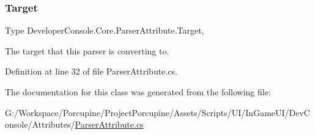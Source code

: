 \subsubsection{\texorpdfstring{Target}{Target}}
{\footnotesize\ttfamily Type Developer\+Console.\+Core.\+Parser\+Attribute.\+Target\hspace{0.3cm}{\ttfamily [get]}, {}}



The target that this parser is converting to. 



Definition at line 32 of file Parser\+Attribute.\+cs.



The documentation for this class was generated from the following file\+:\begin{DoxyCompactItemize}
\item 
G\+:/\+Workspace/\+Porcupine/\+Project\+Porcupine/\+Assets/\+Scripts/\+U\+I/\+In\+Game\+U\+I/\+Dev\+Console/\+Attributes/\hyperlink{_parser_attribute_8cs}{Parser\+Attribute.\+cs}\end{DoxyCompactItemize}

